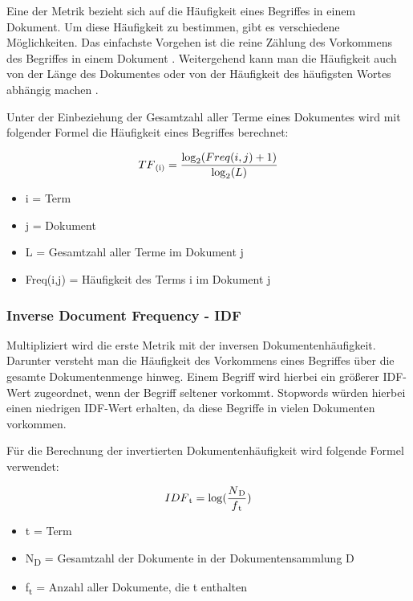 Eine der Metrik bezieht sich auf die Häufigkeit eines Begriffes in einem Dokument. Um diese Häufigkeit zu bestimmen, gibt es verschiedene Möglichkeiten. Das einfachste Vorgehen ist die reine Zählung des Vorkommens des Begriffes in einem Dokument \cite{BrunoStecanella.2019}. Weitergehend kann man die Häufigkeit auch von der Länge des Dokumentes oder von der Häufigkeit des häufigsten Wortes abhängig machen \cite{BrunoStecanella.2019}.

Unter der Einbeziehung der Gesamtzahl aller Terme eines Dokumentes wird mit folgender Formel \cite{JensFrohlich.2020} die Häufigkeit eines Begriffes berechnet:

\begin{equation}
    \nonumber
    TF\textsubscript{(i)} = \frac{\log_2 (Freq(i,j) + 1)}{\log_2 (L)}
\end{equation}

\begin{itemize}
    \item i = Term
    \item j = Dokument
    \item L = Gesamtzahl aller Terme im Dokument j
    \item Freq(i,j) = Häufigkeit des Terms i im Dokument j
\end{itemize}

\subsubsection{Inverse Document Frequency - IDF}

Multipliziert wird die erste Metrik mit der inversen Dokumentenhäufigkeit. Darunter versteht man die Häufigkeit des Vorkommens eines Begriffes über die gesamte Dokumentenmenge hinweg. Einem Begriff wird hierbei ein größerer IDF-Wert zugeordnet, wenn der Begriff seltener vorkommt. Stopwords würden hierbei einen niedrigen IDF-Wert erhalten, da diese Begriffe in vielen Dokumenten vorkommen.

Für die Berechnung der invertierten Dokumentenhäufigkeit wird folgende Formel \cite{JensFrohlich.2020} verwendet: 

\begin{equation}
    \nonumber
    IDF\textsubscript{t} = \log (\frac{N\textsubscript{D}}{f\textsubscript{t}})
\end{equation}

\begin{itemize}
    \item t = Term
    \item N\textsubscript{D} = Gesamtzahl der Dokumente in der Dokumentensammlung D
    \item f\textsubscript{t} = Anzahl aller Dokumente, die t enthalten
\end{itemize}

